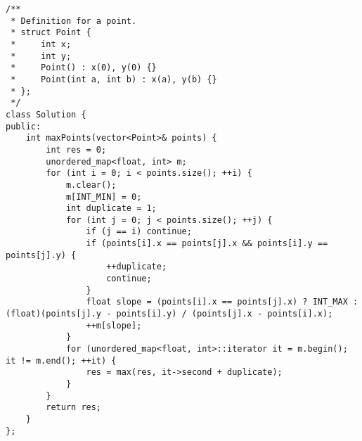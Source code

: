 \begin{lstlisting}
/**
 * Definition for a point.
 * struct Point {
 *     int x;
 *     int y;
 *     Point() : x(0), y(0) {}
 *     Point(int a, int b) : x(a), y(b) {}
 * };
 */
class Solution {
public:
    int maxPoints(vector<Point>& points) {
        int res = 0;
        unordered_map<float, int> m;
        for (int i = 0; i < points.size(); ++i) {
            m.clear();
            m[INT_MIN] = 0;
            int duplicate = 1;
            for (int j = 0; j < points.size(); ++j) {
                if (j == i) continue;
                if (points[i].x == points[j].x && points[i].y == points[j].y) {
                    ++duplicate;
                    continue;
                }
                float slope = (points[i].x == points[j].x) ? INT_MAX : (float)(points[j].y - points[i].y) / (points[j].x - points[i].x);
                ++m[slope];
            }
            for (unordered_map<float, int>::iterator it = m.begin(); it != m.end(); ++it) {
                res = max(res, it->second + duplicate);
            }
        }
        return res;
    }
};
\end{lstlisting}



